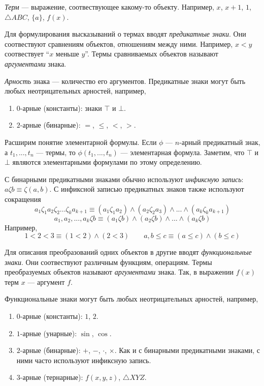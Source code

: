  {\it Терм} --- выражение, соотвествующее какому-то объекту.
Например, $x$, $x+1$, $1$, $\triangle ABC$, $\{a\}$, $f(x)$.

Для формулирования высказываний о термах вводят
{\it предикатные знаки}.
Они соотвествуют сравнениям объектов, отношениям между ними.
Например, $x<y$ соотвествует ``$x$ меньше $y$''.
Термы сравниваемых объектов называют {\it аргументами} знака.

{\it Арность}
знака --- количество его аргументов.
Предикатные знаки могут быть любых неотрицательных арностей, например,
\begin{enumerate}
  \item{}$0$-арные (константы): знаки $\top$ и $\bot$.
  \item{}$2$-арные (бинарные): $=$, $\leq$, $<$, $>$.
\end{enumerate}

Расширим понятие элементарной формулы. Если $\phi$ --- $n$-арный предикатный знак,
а $t_1,...,t_{n}$ --- термы, то $\phi(t_1,...,t_{n})$ --- элементарная формула.
Заметим, что $\top$ и $\bot$ являются элементарными формулами по этому
определению.

С бинарными предикатными знаками обычно используют {\it инфиксную запись}:
$a\zeta b\equiv \zeta(a,b)$. С инфиксной записью предикатных знаков
также используют сокращения
\[
  a_{1}\zeta_{1}a_{2}\zeta_{2}...\zeta_{k}a_{k+1}\equiv
  (a_1\zeta_1 a_2)\land (a_2\zeta_2 a_3)\land ... \land (a_{k}\zeta_{k}a_{k+1})
\]
\[
  a_1,a_2,...,a_{k}\zeta b\equiv (a_1\zeta b)\land (a_2\zeta b)\land ...
  \land (a_{k}\zeta b)
\]
Например,
\[
  1<2<3\equiv (1<2)\land (2<3)\qquad a,b\leq c\equiv (a\leq c)\land (b\leq c)
\]

\pagebreak

Для описания преобразований одних объектов
в другие вводят {\it функциональные знаки}.
Они соотвествуют различным функциям, операциям.
Термы преобразуемых объектов называют {\it аргументами} знака.
Так, в выражении $f(x)$ терм $x$ --- аргумент $f$.

Функциональные знаки могут быть любых неотрицательных арностей, например,
\begin{enumerate}
  \item{}$0$-арные (константы): $1$, $2$.
  \item{}$1$-арные (унарные): $\sin$, $\cos$.
  \item{}$2$-арные (бинарные): $+$, $-$, $\cdot$, $\times$.
  Как и с бинарными предикатными знаками, с ними часто используют инфиксную запись.
  \item{}$3$-арные (тернарные): $f(x,y,z)$, $\triangle XYZ$.
\end{enumerate}

